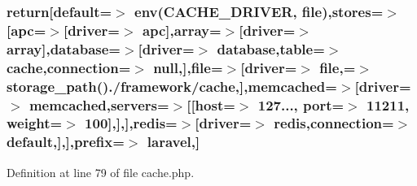 \subsubsection[{return}]{\setlength{\rightskip}{0pt plus 5cm}return[\textquotesingle{}default\textquotesingle{}=$>$ env(\textquotesingle{}C\+A\+C\+H\+E\+\_\+\+D\+R\+I\+V\+E\+R\textquotesingle{}, \textquotesingle{}file\textquotesingle{}),\textquotesingle{}stores\textquotesingle{}=$>$[\textquotesingle{}apc\textquotesingle{}=$>$[\textquotesingle{}driver\textquotesingle{}=$>$ \textquotesingle{}apc\textquotesingle{}],\textquotesingle{}array\textquotesingle{}=$>$[\textquotesingle{}driver\textquotesingle{}=$>$ \textquotesingle{}array\textquotesingle{}],\textquotesingle{}database\textquotesingle{}=$>$[\textquotesingle{}driver\textquotesingle{}=$>$ \textquotesingle{}database\textquotesingle{},\textquotesingle{}table\textquotesingle{}=$>$ \textquotesingle{}cache\textquotesingle{},\textquotesingle{}connection\textquotesingle{}=$>$ null,],\textquotesingle{}file\textquotesingle{}=$>$[\textquotesingle{}driver\textquotesingle{}=$>$ \textquotesingle{}file\textquotesingle{},\textquotesingle{}=$>$ storage\+\_\+path().\textquotesingle{}/framework/cache\textquotesingle{},],\textquotesingle{}memcached\textquotesingle{}=$>$[\textquotesingle{}driver\textquotesingle{}=$>$ \textquotesingle{}memcached\textquotesingle{},\textquotesingle{}servers\textquotesingle{}=$>$[[\textquotesingle{}host\textquotesingle{}=$>$ \textquotesingle{}127...\textquotesingle{}, \textquotesingle{}port\textquotesingle{}=$>$ 11211, \textquotesingle{}weight\textquotesingle{}=$>$ 100],],],\textquotesingle{}redis\textquotesingle{}=$>$[\textquotesingle{}driver\textquotesingle{}=$>$ \textquotesingle{}redis\textquotesingle{},\textquotesingle{}connection\textquotesingle{}=$>$ \textquotesingle{}default\textquotesingle{},],],\textquotesingle{}prefix\textquotesingle{}=$>$ \textquotesingle{}laravel\textquotesingle{},]}\label{config_2cache_8php_a3f15fba03d9f3704abdcb75a6a10d6a2}


Definition at line 79 of file cache.\+php.

